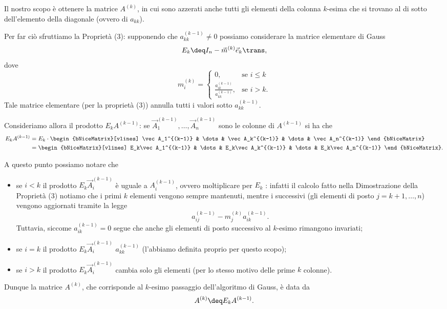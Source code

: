 Il nostro scopo è ottenere la matrice $A^{(k)}$, in cui sono azzerati anche tutti gli elementi della colonna $k$-esima che si trovano al di sotto dell'elemento della diagonale (ovvero di $a_{kk}$).

Per far ciò sfruttiamo la Proprietà (3): supponendo che $a_{kk}^{(k-1)} \neq 0$ possiamo considerare la matrice elementare di Gauss \[
    E_k \deq I_n - \vec m^{(k)}\vec e_k\trans,
\] dove \[
    m_i^{(k)} = \begin{cases}
        0, &\text{se } i \leq k\\[1em]
        \displaystyle \frac{a_{ik}^{(k-1)}}{a_{kk}^{(k-1)}}, &\text{se } i > k.
    \end{cases}
\] Tale matrice elementare (per la proprietà (3)) annulla tutti i valori sotto $a_{kk}^{(k-1)}$. 

Consideriamo allora il prodotto $E_kA^{(k-1)}$: se $\vec A_1^{(k-1)}, \dots, \vec A_n^{(k-1)}$ sono le colonne di $A^{(k-1)}$ si ha che  
\begin{align*}
    E_kA^{(k-1)} &= E_k \cdot \begin{bNiceMatrix}[vlines]
        \vec A_1^{(k-1)} & \dots & \vec A_k^{(k-1)} & \dots & \vec A_n^{(k-1)}   
    \end{bNiceMatrix} \\
    &= \begin{bNiceMatrix}[vlines]
        E_k\vec A_1^{(k-1)} & \dots & E_k\vec A_k^{(k-1)} & \dots & E_k\vec A_n^{(k-1)}
    \end{bNiceMatrix}.
\end{align*}

A questo punto possiamo notare che \begin{itemize}
    \item se $i < k$ il prodotto $E_k\vec A_i^{(k-1)}$ è uguale a $A_i^{(k-1)}$, ovvero moltiplicare per $E_k$ : 
    infatti il calcolo fatto nella Dimostrazione della Proprietà (3) notiamo che i primi $k$ elementi vengono sempre mantenuti, mentre i successivi (gli elementi di posto $j = k+1, \dots, n$) vengono aggiornati tramite la legge \[
        a_{ij}^{(k-1)} - m_{j}^{(k)}a_{ik}^{(k-1)}.
    \] Tuttavia, siccome $a_{ik}^{(k-1)} = 0$ segue che anche gli elementi di posto successivo al $k$-esimo rimangono invariati;
    \item se $i = k$ il prodotto $E_k\vec A_i^{(k-1)}$  $a_{kk}^{(k-1)}$ (l'abbiamo definita proprio per questo scopo);
    \item se $i > k$ il prodotto $E_k\vec A_i^{(k-1)}$ cambia solo gli elementi  (per lo stesso motivo delle prime $k$ colonne). 
\end{itemize}
Dunque la matrice $A^{(k)}$, che corrisponde al $k$-esimo passaggio dell'algoritmo di Gauss, è data da \[
    A^{(k)} \deq E_kA^{(k-1)}.
\] 

